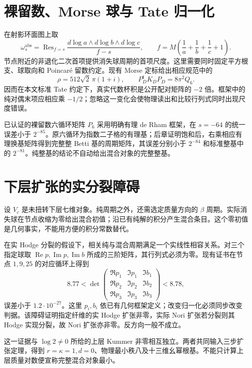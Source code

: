 \documentclass[11pt,a4paper,oneside]{ctexrep}
\theoremstyle{cnplain}
\theoremstyle{definition}
\theoremstyle{remark}
\newcommand{\Res}{\operatorname{Res}}
\begin{document}
\section{裸留数、Morse 球与 Tate 归一化}
在射影环面图上取
\begin{equation}
 \omega_s^{\mathrm{abs}}=\Res_{f=s}
 \frac{d\log a\wedge d\log b\wedge d\log c}{f-s},\qquad
 f=M\left(\frac1a+\frac1b+\frac1c+1\right).
\end{equation}
节点附近的非退化二次首项提供消失球周期的首项尺度。这里需要同时固定平方根支、球取向和 Poincaré 留数约定。现有 Morse 定标给出相应规范中的
\begin{equation}
 \rho=512\sqrt2\,\pi(1+i),\qquad
 P_D^{\mathsf t}K_DP_D=8\pi^2Q_6.
\end{equation}
因而在本文标准 Tate 约定下，真实代数杯积是公开配对矩阵的 $-2$ 倍。框架中的纯对偶末项应相应乘 $-1/2$；忽略这一变化会使物理读出和比较行列式同时出现尺度错误。

已认证的裸留数六循环矩阵 $P_6$ 采用明确有理 de Rham 框架，在 $s=-64$ 的统一误差小于 $2^{-85}$。原六循环为指数二子格的有理基；后章证明饱和后，右乘相应有理换基矩阵得到完整整 Betti 基的周期矩阵，其误差分别小于 $2^{-84}$ 和标准整基中的 $2^{-81}$。纯整基的结论不自动给出混合对象的完整整基。

\section{下层扩张的实分裂障碍}
设 $V_c$ 是未扭转下层七维对象。纯周期之外，还需选定质量方向的 $\beta$ 周期。实际消失球在节点收缩为零给出混合初值；沿已有纯解的积分产生混合条目。这个零初值是几何事实，不能用方便的积分常数替代。

在实 Hodge 分裂的假设下，相关纯与混合周期满足一个实线性相容关系。对三个指定球取 $\operatorname{Re}p,\operatorname{Im}p,\operatorname{Im}b$ 所成的三阶矩阵，其行列式必须为零。现有证书在节点 $1,9,25$ 的对应循环上得到
\begin{equation}
 8.77<\det\begin{pmatrix}
 \Re p_1&\Im p_1&\Im b_1\\
 \Re p_2&\Im p_2&\Im b_2\\
 \Re p_3&\Im p_3&\Im b_3
 \end{pmatrix}<8.78,
\end{equation}
误差小于 $1.2\cdot10^{-27}$。这里 $p_i,b_i$ 依已有几何框架定义；改变归一化必须同步改变判据。该障碍证明指定纤维的实 Hodge 扩张非零，实际 Nori 扩张若分裂则其 Hodge 实现分裂，故 Nori 扩张亦非零。反方向一般不成立。

这一证据与 $\log2\ne0$ 所给的上层 Kummer 非零相互独立。两者共同输入三步扩张定理，得到 $r=\kappa=1,d=0$、物理最小秩八及十三维幺幂根基。不能只计算上层质量对数便宣称完整混合对象最小。
\end{document}
